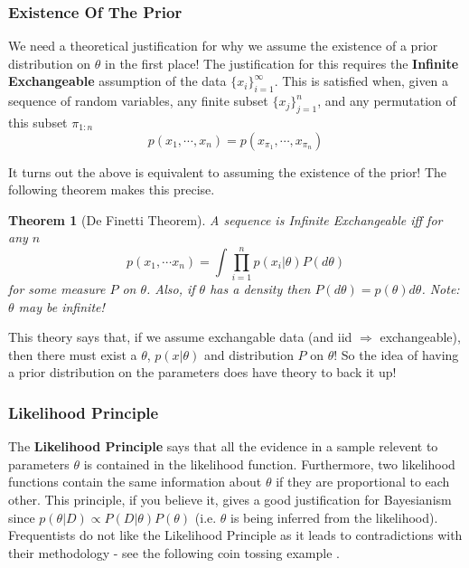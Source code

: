 \documentclass[]{article}
\theoremstyle{mattstyle}
\newtheorem{theorem}{Theorem}[section]
\theoremstyle{definition}
\begin{document}
\subsubsection{Existence Of The Prior}
We need a theoretical justification for why we assume the existence of a prior distribution on \(\theta\) in the first place! The justification for this requires the \textbf{Infinite Exchangeable} assumption of the data \(\{x_i\}_{i=1}^{\infty}\). This is satisfied when, given a sequence of random variables, any finite subset \(\{x_j\}_{j=1}^{n}\), and any permutation of this subset \(\pi_{1:n}\) 
\begin{equation}
p(x_1, \cdots, x_n) = p(x_{\pi_1}, \cdots, x_{\pi_n})
\end{equation}

It turns out the above is equivalent to assuming the existence of the prior! The following theorem makes this precise.

\begin{theorem}[De Finetti Theorem]
	A sequence is Infinite Exchangeable iff for any \(n\)
	$$ p(x_1, \cdots x_n) = \int\prod_{i=1}^n p(x_i|\theta)P(d\theta) $$
	for some measure \(P\) on \(\theta\). Also, if $\theta$ has a density then $P(d\theta) = p(\theta)d\theta$. Note: \(\theta\) may be infinite!
\end{theorem}

This theory says that, if we assume exchangable data (and iid $\Rightarrow$ exchangeable), then there must exist a \(\theta\), \(p(x|\theta)\) and distribution \(P\) on \(\theta\)! So the idea of having a prior distribution on the parameters does have theory to back it up!


\subsubsection{Likelihood Principle}

The \textbf{Likelihood Principle} says that all the evidence in a sample relevent to parameters \(\theta\) is contained in the likelihood function. Furthermore, two likelihood functions contain the same information about \(\theta\) if they
are proportional to each other.\cite{slides} This principle, if you believe it, gives a good justification for Bayesianism since \(p(\theta|D) \propto P(D|\theta)P(\theta)\) (i.e. $\theta$ is being inferred from the likelihood). Frequentists do not like the Likelihood Principle as it leads to contradictions with their methodology - see the following coin tossing example \cite{MJordanNotes}.
\end{document}
